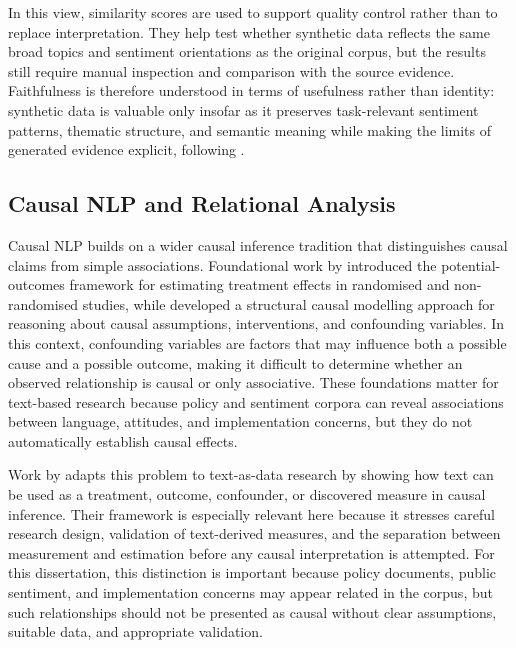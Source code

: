 In this view, similarity scores are used to support quality control rather than to
replace interpretation. They help test whether synthetic data reflects the same broad
topics and sentiment orientations as the original corpus, but the results still
require manual inspection and comparison with the source evidence. Faithfulness is
therefore understood in terms of usefulness rather than identity: synthetic data is
valuable only insofar as it preserves task-relevant sentiment patterns, thematic
structure, and semantic meaning while making the limits of generated evidence
explicit, following \cite{snoke2018general}.


\subsection{Causal NLP and Relational Analysis}

Causal NLP builds on a wider causal inference tradition that distinguishes causal
claims from simple associations. Foundational work by \cite{rubin1974estimating}
introduced the potential-outcomes framework for estimating treatment effects in
randomised and non-randomised studies, while \cite{pearl2009causality} developed a
structural causal modelling approach for reasoning about causal assumptions,
interventions, and confounding variables. In this context, confounding variables are
factors that may influence both a possible cause and a possible outcome, making it
difficult to determine whether an observed relationship is causal or only
associative. These foundations matter for text-based research because policy and
sentiment corpora can reveal associations between language, attitudes, and
implementation concerns, but they do not automatically establish causal effects.

Work by \cite{egami2022causal} adapts this problem to text-as-data research by
showing how text can be used as a treatment, outcome, confounder, or discovered
measure in causal inference. Their framework is especially relevant here because it
stresses careful research design, validation of text-derived measures, and the
separation between measurement and estimation before any causal interpretation is
attempted. For this dissertation, this distinction is important because policy
documents, public sentiment, and implementation concerns may appear related in the
corpus, but such relationships should not be presented as causal without clear
assumptions, suitable data, and appropriate validation.


